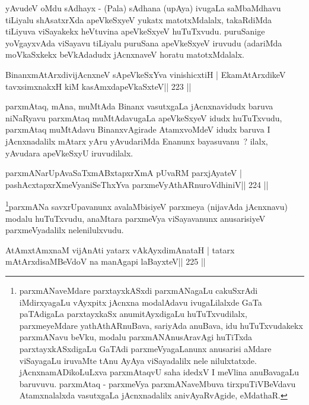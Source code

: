 \begin{artha}
yAvudeV oMdu sAdhayx - (Pala) sAdhana (upAya) ivugaLa saMbaMdhavu tiLiyalu shAsatxrXda apeVkeSxyeV yukatx matotxMdalalx, takaRdiMda tiLiyuva viSayakekx heVtuvina apeVkeSxyeV huTuTxvudu. puruSanige yoVgayxvAda viSayavu tiLiyalu puruSana apeVkeSxyeV iruvudu (adariMda moVkaSxkekx beVkAdadudx jAcnxnaveV horatu matotxMdalalx.
\end{artha}

\begin{shl}
BinanxmAtArxdivijAcnxneV sApeVkeSxYva vinishicxtiH |
EkamAtArxdikeV tavxsimxnakxH kiM kasAmxdapeVkaSxteV\hfill || 223 ||
\end{shl}

\begin{artha}
parxmAtaq, mAna, muMtAda Binanx vasutxgaLa jAcnxnavidudx baruva niNaRyavu parxmAtaq muMtAdavugaLa apeVkeSxyeV idudx huTuTxvudu, parxmAtaq muMtAdavu BinanxvAgirade AtamxvoMdeV idudx baruva I jAcnxnadalilx mAtarx yAru yAvudariMda Enanunx bayasuvanu~? ilalx, yAvudara apeVkeSxyU iruvudilalx.
\end{artha}


\begin{shl}
parxmANarUpAvaSaTxmABxtapxrXmA pUvaRM parxjAyateV |
pashAcxtapxrXmeVyaniSeThxYva parxmeVyAthARnuroVdhiniV\hfill || 224 ||
\end{shl}

\begin{artha}
\footnote{parxmANaveMdare parxtayxkASxdi parxmANagaLu cakuSxrAdi iMdirxyagaLu vAyxpitx jAcnxna modalAdavu ivugaLilalxde GaTa paTAdigaLa parxtayxkaSx anumitAyxdigaLu huTuTxvudilalx, parxmeyeMdare yathAthARnuBava, sariyAda anuBava, idu huTuTxvudakekx parxmANavu beVku, modalu parxmANAnusAravAgi huTiTxda parxtayxkASxdigaLu GaTAdi parxmeVyagaLanunx anusarisi aMdare viSayagaLu iruvaMte tAnu AyAya viSayadalilx nele nilulxtatxde. jAcnxnamADikoLuLxva parxmAtaqvU saha idedxV I meVlina anuBavagaLu baruvuvu. parxmAtaq - parxmeVya parxmANaveMbuva tirxpuTiVBeVdavu Atamxnalalxda vasutxgaLa jAcnxnadalilx anivAyaRvAgide, eMdathaR.}parxmANa savxrUpavanunx avalaMbisiyeV parxmeya (nijavAda jAcnxnavu) modalu huTuTxvudu, anaMtara parxmeVya viSayavanunx anusarisiyeV parxmeVyadalilx nelenilulxvudu.
\end{artha}


\begin{shl}
AtAmx\s\s tAmxnaM vijAnAti yatarx vAkAyxdimAnataH |
tatarx mAtArxdisaMBeVdoV na manAgapi laBayxteV\hfill || 225 ||
\end{shl}

